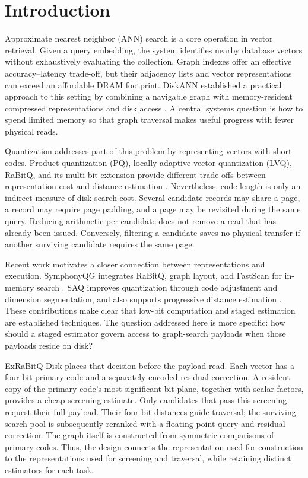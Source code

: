 \section{Introduction}

Approximate nearest neighbor (ANN) search is a core operation in vector retrieval. Given a query embedding, the system identifies nearby database vectors without exhaustively evaluating the collection. Graph indexes offer an effective accuracy--latency trade-off, but their adjacency lists and vector representations can exceed an affordable DRAM footprint. DiskANN established a practical approach to this setting by combining a navigable graph with memory-resident compressed representations and disk access \cite{diskann}. A central systems question is how to spend limited memory so that graph traversal makes useful progress with fewer physical reads.

Quantization addresses part of this problem by representing vectors with short codes. Product quantization (PQ), locally adaptive vector quantization (LVQ), RaBitQ, and its multi-bit extension provide different trade-offs between representation cost and distance estimation \cite{pq,lvq,rabitq,exrabitq}. Nevertheless, code length is only an indirect measure of disk-search cost. Several candidate records may share a page, a record may require page padding, and a page may be revisited during the same query. Reducing arithmetic per candidate does not remove a read that has already been issued. Conversely, filtering a candidate saves no physical transfer if another surviving candidate requires the same page.

Recent work motivates a closer connection between representations and execution. SymphonyQG integrates RaBitQ, graph layout, and FastScan for in-memory search \cite{symphonyqg}. SAQ improves quantization through code adjustment and dimension segmentation, and also supports progressive distance estimation \cite{saq}. These contributions make clear that low-bit computation and staged estimation are established techniques. The question addressed here is more specific: how should a staged estimator govern access to graph-search payloads when those payloads reside on disk?

ExRaBitQ-Disk places that decision before the payload read. Each vector has a four-bit primary code and a separately encoded residual correction. A resident copy of the primary code's most significant bit plane, together with scalar factors, provides a cheap screening estimate. Only candidates that pass this screening request their full payload. Their four-bit distances guide traversal; the surviving search pool is subsequently reranked with a floating-point query and residual correction. The graph itself is constructed from symmetric comparisons of primary codes. Thus, the design connects the representation used for construction to the representations used for screening and traversal, while retaining distinct estimators for each task.

